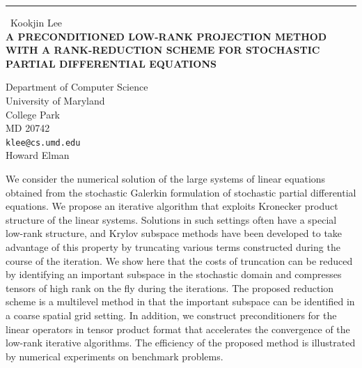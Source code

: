 \documentclass{report}
\begin{document}
\begin{center}
\rule{6in}{1pt} \
{\large Kookjin Lee \\
{\bf A PRECONDITIONED LOW-RANK PROJECTION METHOD WITH A RANK-REDUCTION SCHEME FOR STOCHASTIC PARTIAL DIFFERENTIAL EQUATIONS}}

Department of Computer Science \\ University of Maryland \\ College Park \\ MD 20742
\\
{\tt klee@cs.umd.edu}\\
Howard Elman\end{center}

We consider the numerical solution of the large systems of linear
equations obtained from the stochastic Galerkin formulation of stochastic
partial differential equations. We propose an iterative algorithm that
exploits Kronecker product structure of the linear systems. Solutions in
such settings often have a special low-rank structure, and Krylov
subspace methods have been developed to take advantage of this property
by truncating various terms constructed during the course of the
iteration. We show here that the costs of truncation can be reduced by
identifying an important subspace in the stochastic domain and compresses
tensors of high rank on the fly during the iterations. The proposed
reduction scheme is a multilevel method in that the important subspace
can be identified in a coarse spatial grid setting. In addition, we
construct preconditioners for the linear operators in tensor product
format that accelerates the convergence of the low-rank iterative
algorithms. The efficiency of the proposed method is illustrated by
numerical experiments on benchmark problems.
\end{document}
